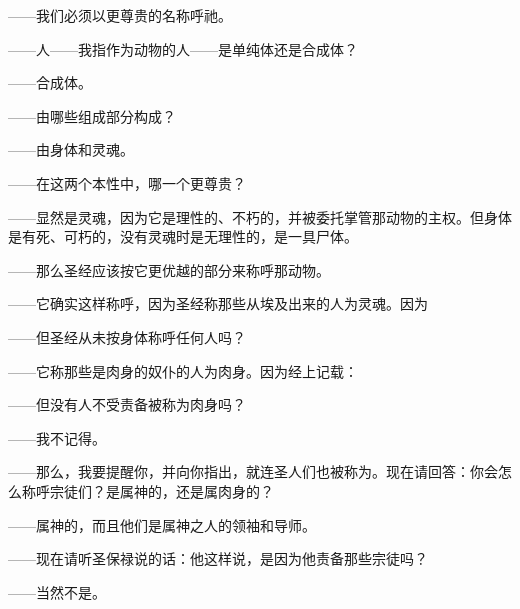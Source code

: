 ——我们必须以更尊贵的名称呼祂。\par

——人——我指作为动物的人——是单纯体还是合成体？\par

——合成体。\par

——由哪些组成部分构成？\par

——由身体和灵魂。\par

——在这两个本性中，哪一个更尊贵？\par

——显然是灵魂，因为它是理性的、不朽的，并被委托掌管那动物的主权。但身体是有死、可朽的，没有灵魂时是无理性的，是一具尸体。\par

——那么圣经应该按它更优越的部分来称呼那动物。\par

——它确实这样称呼，因为圣经称那些从埃及出来的人为灵魂。因为\par

——但圣经从未按身体称呼任何人吗？\par

——它称那些是肉身的奴仆的人为肉身。因为经上记载：\par

——但没有人不受责备被称为肉身吗？\par

——我不记得。\par

——那么，我要提醒你，并向你指出，就连圣人们也被称为。现在请回答：你会怎么称呼宗徒们？是属神的，还是属肉身的？\par

——属神的，而且他们是属神之人的领袖和导师。\par

——现在请听圣保禄说的话：他这样说，是因为他责备那些宗徒吗？\par

——当然不是。\par

